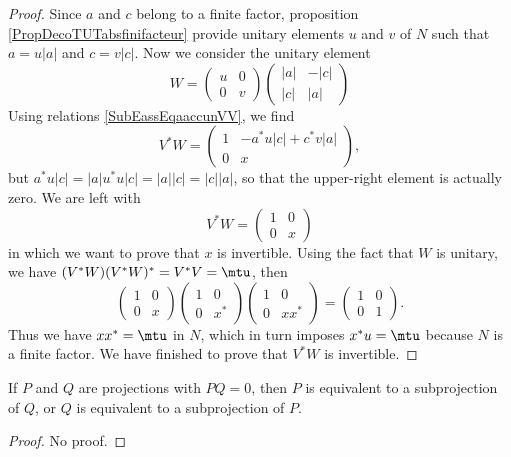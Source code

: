\begin{proof}
Since $a$ and $c$ belong to a finite factor, proposition \ref{PropDecoTUTabsfinifacteur} provide unitary elements $u$ and $v$ of $N$ such that $a=u| a |$ and $c=v| c |$. Now we consider the unitary element
\[ 
  W=
\begin{pmatrix}
u&0\\
0&v
\end{pmatrix}
\begin{pmatrix}
| a |&-| c |\\
| c |&| a |
\end{pmatrix}
\]
Using relations \eqref{SubEassEqaaccunVV}, we find
\[ 
  V^*W=
\begin{pmatrix}
1	&	-a^*u| c |+c^*v| a |\\
0	&	x
\end{pmatrix},
\]
but $a^*u| c |=| a |u^*u| c |=| a | | c |=| c | |a |$, so that the upper-right element is actually zero. We are left with
\[ 
  V^*W=
\begin{pmatrix}
1	&0\\
0	&x
\end{pmatrix}
\]
in which we want to prove that $x$ is invertible. Using the fact that $W$ is unitary, we have $(V^*W)(V^*W)^*=V^*V=\mtu$, then
\[ 
  \begin{pmatrix}
1	&	0\\
0	&	x
\end{pmatrix}
  \begin{pmatrix}
1	&	0\\
0	&	x^*
\end{pmatrix}
  \begin{pmatrix}
1	&	0\\
0	&	xx^*
\end{pmatrix}
=
  \begin{pmatrix}
1	&	0\\
0	&	1
\end{pmatrix}.
\]
Thus we have $xx^*=\mtu$ in $N$, which in turn imposes $x^*u=\mtu$ because $N$ is a finite factor. We have finished to prove that $V^*W$ is invertible.
\end{proof}

\begin{lemma}
If $P$ and $Q$ are projections with $PQ=0$, then $P$ is equivalent to a subprojection of $Q$, or $Q$ is equivalent to a subprojection of $P$.
\end{lemma}
\begin{proof}
No proof.
\end{proof}


